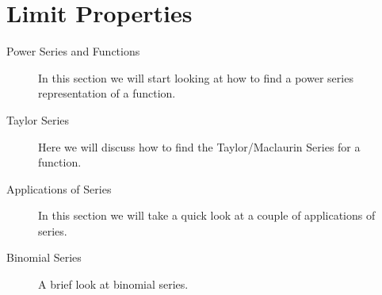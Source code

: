 \documentclass{beamer}
\begin{document}
	\section{Limit Properties}
	
	\begin{description}
		\item[Power Series and Functions]  In this section we will start looking at how to find a power series representation of a function.
		
		\item[Taylor Series]  Here we will discuss how to find the Taylor/Maclaurin Series for a function.
		
		\item[Applications of Series]  In this section we will take a quick look at a couple of applications of series.
		
		\item[Binomial Series]  A brief look at binomial series.
	\end{description}
	
	
\end{document}

